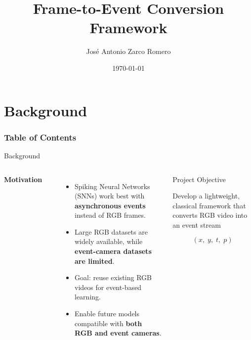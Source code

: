 \documentclass[10pt,xcolor=x11names,compress]{beamer}
\title[Frame-to-Event Conversion Framework]{Frame-to-Event Conversion Framework}
\author[José Antonio Zarco Romero]{José Antonio Zarco Romero}
\date{\today}
\institute{Technische Hochschule Ingolstadt}
\begin{document}
\begin{frame}
  \titlepage
\end{frame}

\section{Background}

\begin{frame}
  \frametitle{\textbf{Table of Contents}}
  \tableofcontents[
  hideallsubsections=false
  sectionstyle=show/shaded,    
  subsectionstyle=show/shaded/hide, 
  section=1-100                
  ]
\end{frame}

\begin{frame}{Background}

  \begin{columns}[T]



    {\Large\bfseries Motivation}

    \vspace{0.1cm}
    \color{colorLeft}\rule{\linewidth}{1pt}

    \vspace{0.1cm}

    \begin{itemize}
    \item Spiking Neural Networks (SNNs) work best with
      \textbf{asynchronous events} instead of RGB frames.

    \item Large RGB datasets are widely available,
      while \textbf{event-camera datasets are limited}.

    \item Goal: reuse existing RGB videos for
      event-based learning.

    \item Enable future models compatible with
      \textbf{both RGB and event cameras}.
    \end{itemize}



    \begin{block}{Project Objective}

      Develop a lightweight, classical framework that converts
      RGB video into an event stream

      \vspace{0.4cm}

      \[
        (x,\;y,\;t,\;p)
      \]


\end{block}
\end{columns}
\end{frame}
\end{document}
